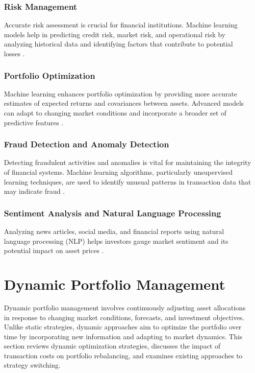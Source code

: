 \subsubsection{Risk Management}

Accurate risk assessment is crucial for financial institutions. Machine learning models help in predicting credit risk, market risk, and operational risk by analyzing historical data and identifying factors that contribute to potential losses \cite{lessmann2015benchmarking}.

\subsubsection{Portfolio Optimization}

Machine learning enhances portfolio optimization by providing more accurate estimates of expected returns and covariances between assets. Advanced models can adapt to changing market conditions and incorporate a broader set of predictive features \cite{heaton2017deep}.

\subsubsection{Fraud Detection and Anomaly Detection}

Detecting fraudulent activities and anomalies is vital for maintaining the integrity of financial systems. Machine learning algorithms, particularly unsupervised learning techniques, are used to identify unusual patterns in transaction data that may indicate fraud \cite{phua2010comprehensive}.

\subsubsection{Sentiment Analysis and Natural Language Processing}

Analyzing news articles, social media, and financial reports using natural language processing (NLP) helps investors gauge market sentiment and its potential impact on asset prices \cite{hagenau2013automated, loughran2011liability}.


\section{Dynamic Portfolio Management}

Dynamic portfolio management involves continuously adjusting asset allocations in response to changing market conditions, forecasts, and investment objectives. Unlike static strategies, dynamic approaches aim to optimize the portfolio over time by incorporating new information and adapting to market dynamics. This section reviews dynamic optimization strategies, discusses the impact of transaction costs on portfolio rebalancing, and examines existing approaches to strategy switching.


